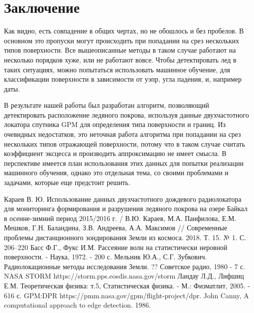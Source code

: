 \section{Заключение}
Как видно, есть совпадение в общих чертах, но не обошлось и без пробелов. В основном это пропуски могут происходить при
попадании на срез нескольких типов поверхности. Все вышеописанные методы в таком случае работают на несколько порядков
хуже, или не работают вовсе. Чтобы детектировать лед в таких ситуациях, можно попытаться использовать машинное обучение,
для классификации поверхности в зависимости от уэпр, угла падения, и, например даты.


В результате нашей работы был разработан алгоритм, позволяющий детектировать расположение ледяного покрова, используя
данные двухчастотного локатора спутника GPM для определения типа поверхности и границ.
Из очевидных недостатков, это неточная работа алгоритма при попадании на срез нескольких типов отражающей поверхности,
потому что в таком случае считать коэффициент эксцесса и производить аппроксимацию не имеет смысла. 
В перспективе имеется план использования этих данных для попытки реализации машинного обучения, однако это отдельная
тема, со своими проблемами и задачами, которые еще предстоит решить. 


\newpage
{}
\begin{thebibliography}{99}
 Караев В. Ю. Использование данных двухчастотного дождевого радиолокатора для мониторинга формирования
и разрушения ледяного покрова на озере Байкал в осенне-зимний период 2015/2016 г. / В.Ю. Караев, М.А. Панфилова, Е.М.
Мешков, Г.Н. Баландина, З.В. Андреева, А.А. Максимов // Современные проблемы дистанционного зондирования Земли из
космоса. 2018. Т. 15. № 1. С. 206–220
 Басс Ф.Г., Фукс И.М. Рассеяние волн на статистически неровной поверхности. - Наука, 1972. - 200 с.
 Мельник Ю.А., С.Г. Зубкович. Радиолокационные методы исследования Земли. ?? Советское радио, 1980 - 7 с.
 NASA STORM https://storm.pps.eosdis.nasa.gov/storm
 Ландау Л.Д., Лифшиц Е.М. Теоретическая физика: т.5, Статистическая физика. - М.: Физматлит, 2005. - 616 с.
 GPM:DPR https://pmm.nasa.gov/gpm/flight-project/dpr.
 John Canny, A computational approach to edge detection. 1986.
\end{thebibliography}

